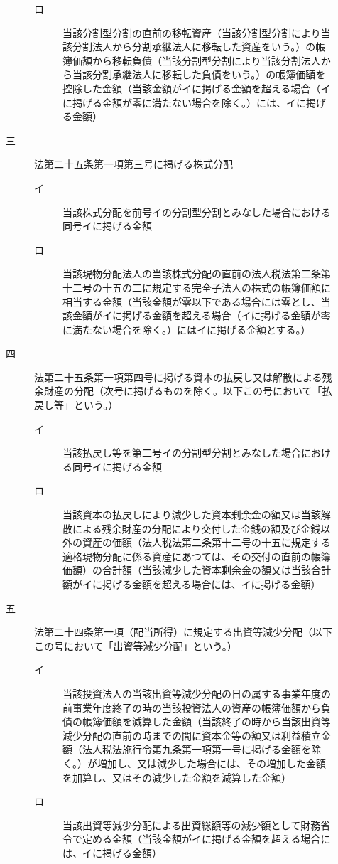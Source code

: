 \documentclass[twocolumn,a4j,10pt]{ltjtarticle}
\begin{document}
\begin{description}
\begin{description}
\begin{description}
\item[ロ]当該分割型分割の直前の移転資産（当該分割型分割により当該分割法人から分割承継法人に移転した資産をいう。）の帳簿価額から移転負債（当該分割型分割により当該分割法人から当該分割承継法人に移転した負債をいう。）の帳簿価額を控除した金額（当該金額がイに掲げる金額を超える場合（イに掲げる金額が零に満たない場合を除く。）には、イに掲げる金額）
\end{description}
\item[三]法第二十五条第一項第三号に掲げる株式分配
\begin{description}
\item[イ]当該株式分配を前号イの分割型分割とみなした場合における同号イに掲げる金額
\item[ロ]当該現物分配法人の当該株式分配の直前の法人税法第二条第十二号の十五の二に規定する完全子法人の株式の帳簿価額に相当する金額（当該金額が零以下である場合には零とし、当該金額がイに掲げる金額を超える場合（イに掲げる金額が零に満たない場合を除く。）にはイに掲げる金額とする。）
\end{description}
\item[四]法第二十五条第一項第四号に掲げる資本の払戻し又は解散による残余財産の分配（次号に掲げるものを除く。以下この号において「払戻し等」という。）
\begin{description}
\item[イ]当該払戻し等を第二号イの分割型分割とみなした場合における同号イに掲げる金額
\item[ロ]当該資本の払戻しにより減少した資本剰余金の額又は当該解散による残余財産の分配により交付した金銭の額及び金銭以外の資産の価額（法人税法第二条第十二号の十五に規定する適格現物分配に係る資産にあつては、その交付の直前の帳簿価額）の合計額（当該減少した資本剰余金の額又は当該合計額がイに掲げる金額を超える場合には、イに掲げる金額）
\end{description}
\item[五]法第二十四条第一項（配当所得）に規定する出資等減少分配（以下この号において「出資等減少分配」という。）
\begin{description}
\item[イ]当該投資法人の当該出資等減少分配の日の属する事業年度の前事業年度終了の時の当該投資法人の資産の帳簿価額から負債の帳簿価額を減算した金額（当該終了の時から当該出資等減少分配の直前の時までの間に資本金等の額又は利益積立金額（法人税法施行令第九条第一項第一号に掲げる金額を除く。）が増加し、又は減少した場合には、その増加した金額を加算し、又はその減少した金額を減算した金額）
\item[ロ]当該出資等減少分配による出資総額等の減少額として財務省令で定める金額（当該金額がイに掲げる金額を超える場合には、イに掲げる金額）

\end{description}
\end{description}
\end{description}
\end{document}
